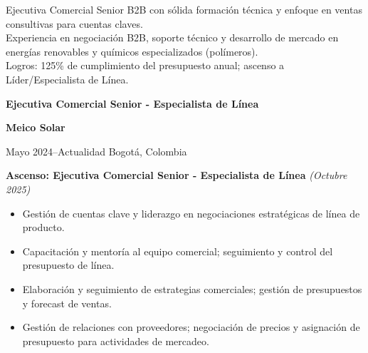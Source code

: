 \documentclass[10pt,a4paper]{altacv}
\renewcommand{\cvevent}[4]{%
  {\large\bfseries\color{emphasis}#1\par}
  \smallskip
  \textbf{\color{accent}#2}\par
  \smallskip
  {\small\faCalendar \hspace{0.5em}#3\hspace{2em}%
  \ifstrequal{#4}{}{}{\faMapMarker\hspace{0.5em}#4}\par}
  \medskip
}
\begin{document}

\makecvheader

{\small\justifying
Ejecutiva Comercial Senior B2B con sólida formación técnica y enfoque en ventas consultivas para cuentas claves.\\
Experiencia en negociación B2B, soporte técnico y desarrollo de mercado en energías renovables y químicos especializados (polímeros).\\
Logros: 125\% de cumplimiento del presupuesto anual; ascenso a Líder/Especialista de Línea.
\par}

\cvevent{Ejecutiva Comercial Senior - Especialista de Línea}{Meico Solar}{Mayo 2024--Actualidad}{Bogotá, Colombia}
{\color{accent}\textbf{Ascenso: Ejecutiva Comercial Senior - Especialista de Línea}} {\small\textit{(Octubre 2025)}}
\begin{itemize}
\item Gestión de cuentas clave y liderazgo en negociaciones estratégicas de línea de producto.
\item Capacitación y mentoría al equipo comercial; seguimiento y control del presupuesto de línea.
\item Elaboración y seguimiento de estrategias comerciales; gestión de presupuestos y forecast de ventas.
\item Gestión de relaciones con proveedores; negociación de precios y asignación de presupuesto para actividades de mercadeo.
\end{itemize}
\end{document}
